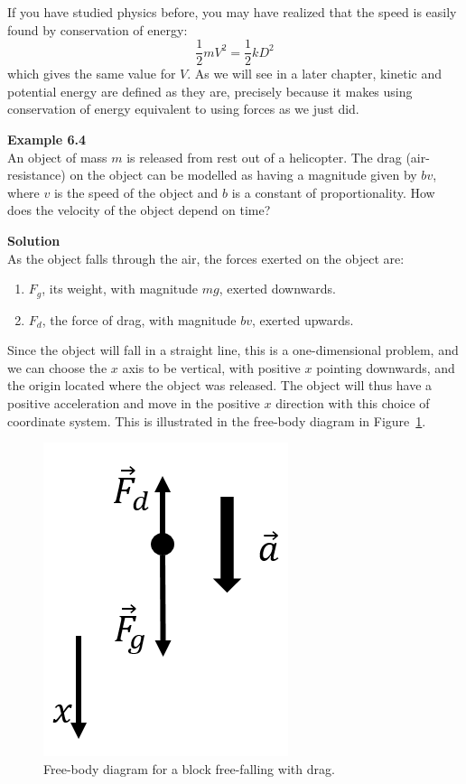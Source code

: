 \begin{framed}
\begin{framed}
If you have studied physics before, you may have realized that the speed is easily found by conservation of energy:
\begin{equation}
\frac{1}{2}mV^2=\frac{1}{2}kD^2
\end{equation}
which gives the same value for $V$. As we will see in a later chapter, kinetic and potential energy are defined as they are, precisely because it makes using conservation of energy equivalent to using forces as we just did.
\end{framed}
\end{framed}

\begin{framed}
\textbf{Example 6.4}\\
An object of mass $m$ is released from rest out of a helicopter. The drag (air-resistance) on the object can be modelled as having a magnitude given by $bv$, where $v$ is the speed of the object and $b$ is a constant of proportionality. How does the velocity of the object depend on time?

\begin{framed}
\textbf{Solution}\\
As the object falls through the air, the forces exerted on the object are:

\begin{enumerate}
\item $F_g$, its weight, with magnitude $mg$, exerted downwards.
\item $F_d$, the force of drag, with magnitude $bv$, exerted upwards.
\end{enumerate}

Since the object will fall in a straight line, this is a one-dimensional problem, and we can choose the $x$ axis to be vertical, with positive $x$ pointing downwards, and the origin located where the object was released. The object will thus have a positive acceleration and move in the positive $x$ direction with this choice of coordinate system. This is illustrated in the free-body diagram in Figure~\ref{fig:applyingnewtonslaws:drag_fbd}.

\begin{figure}[!htbp]
\centering
\includegraphics[width=0.2\linewidth]{files/drag_fbd-26e723b9982f949036c077b5eb8d1210.png}
\caption[]{Free-body diagram for a block free-falling with drag.}
\label{fig:applyingnewtonslaws:drag_fbd}
\end{figure}


\end{framed}
\end{framed}

